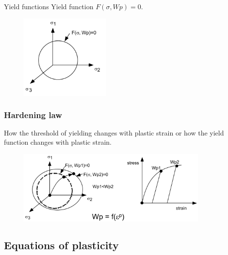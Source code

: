 \documentclass[notes]{beamer}
\begin{document}
\begin{frame}{Yield functions}
	Yield function $F(\sigma, Wp) = 0$.
	\begin{figure}
		\includegraphics[width=0.4\textwidth]{figs/yieldfn.png}
	\end{figure}
\end{frame}

\begin{frame}
\frametitle{Hardening law}
How the threshold of yielding changes with plastic strain or how the yield function changes with plastic strain.
\begin{figure}
	\includegraphics[width=0.85\textwidth]{figs/hardening-law.png}
\end{figure}
\end{frame}

\subsection{Equations of plasticity}
\end{document}
